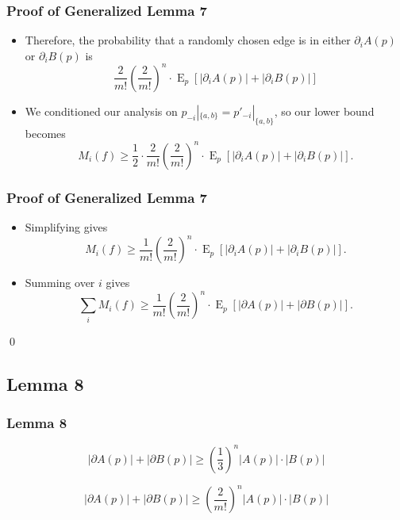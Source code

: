 \documentclass[aspectratio=169]{beamer}
\DeclareMathOperator{\expectedvalue}{E}
\begin{document}
		\begin{frame}
			\frametitle{Proof of Generalized Lemma 7}

			\begin{itemize}
				\item Therefore, the probability that a randomly chosen edge is in either $\partial_i A(p)$ or $\partial_i B(p)$ is
					\[
						\frac{2}{m!} \left(\frac{2}{m!}\right)^{n} \cdot \expectedvalue_p \left[ |\partial_i A(p)| + |\partial_i B(p)| \right]
					\]
				\item We conditioned our analysis on $p_{-i}|_{\{a,b\}} = p'_{-i}|_{\{a,b\}}$, so our lower bound becomes
					\[
						M_i(f) \ge \frac{1}{2} \cdot \frac{2}{m!}\left(\frac{2}{m!}\right)^{n} \cdot \expectedvalue_p \left[ |\partial_i A(p)| + |\partial_i B(p)| \right].
					\]
			\end{itemize}
		\end{frame}

		\begin{frame}
			\frametitle{Proof of Generalized Lemma 7}

			\begin{itemize}
				\item Simplifying gives
					\[
						M_i(f) \ge \frac{1}{m!}\left(\frac{2}{m!}\right)^{n} \cdot \expectedvalue_p \left[ |\partial_i A(p)| + |\partial_i B(p)| \right].
					\]
				\item Summing over $i$ gives
					\[
						\sum_i M_i(f) \ge \frac{1}{m!}\left(\frac{2}{m!}\right)^{n} \cdot \expectedvalue_p \left[ |\partial A(p)| + |\partial B(p)| \right].
					\]
			\end{itemize}

			\qed
		\end{frame}


	\subsection{Lemma 8}

		\begin{frame}
			\frametitle{Lemma 8}

			\begin{lemma}
				\[
					|\partial A(p)| + |\partial B(p)| \ge \left( \frac{1}{3} \right)^n |A(p)| \cdot |B(p)|
				\]
			\end{lemma}

			\begin{lemma}
				\[
					|\partial A(p)| + |\partial B(p)| \ge \left( \frac{2}{m!} \right)^n |A(p)| \cdot |B(p)|
				\]
			\end{lemma}

		\end{frame}
\end{document}
